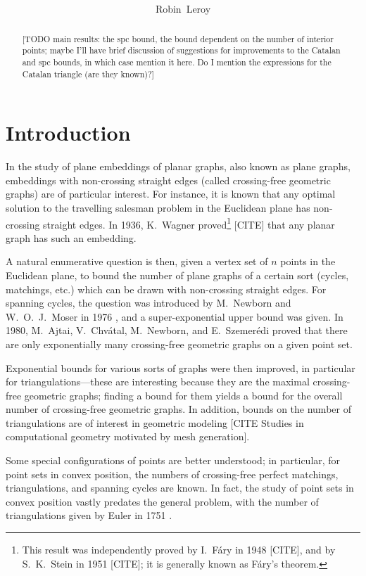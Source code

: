 \documentclass[10pt, a4paper, twoside]{basestyle}
\title{%
\textdisplay{%
Crossing-Free Perfect Matchings%
}%
}
\author{Robin~Leroy}
\begin{document}
\maketitle
\begin{abstract}
[TODO main results: the spc bound, the bound dependent on the number of interior points;
maybe I'll have brief discussion of suggestions for improvements to the Catalan and spc
bounds, in which case mention it here.
Do I mention the expressions for the Catalan triangle (are they known)?]
\end{abstract}

\section*{Introduction}
In the study of plane embeddings of planar graphs, also known as plane graphs,
embeddings with non-crossing straight edges (called crossing-free geometric graphs) are of particular
interest.
For instance, it is known \cite{LeeuwenSchoone1981} that any optimal solution to the travelling salesman problem in the
Euclidean plane has non-crossing straight edges.
In 1936, K.~Wagner proved\footnote{This result was independently proved by I.~Fáry in 1948 [CITE], and by
S.~K.~Stein in 1951 [CITE]; it is generally known as Fáry's theorem.} [CITE] that any planar graph has such an
embedding.

A natural enumerative question is then, given a vertex set of $n$ points in the Euclidean plane,
to bound the number of plane graphs of a certain sort (cycles, matchings, etc.) which can be
drawn with non-crossing straight edges.
For spanning cycles, the question was introduced by M.~Newborn and W.~O.~J.~Moser in 1976 \cite{NewbornMoser1980},
and a super-exponential upper bound was given.
In 1980, M.~Ajtai, V.~Chvátal, M.~Newborn, and E.~Szemerédi \cite{AjtaiChvatalNewbornSzemeredi1982}
proved that there are only exponentially many crossing-free geometric graphs on a given point set.

Exponential bounds for various sorts of graphs were then improved, in particular for triangulations---these are
interesting because they are the maximal crossing-free geometric graphs; finding a bound for them yields a bound
for the overall number of crossing-free geometric graphs. In addition, bounds on the number of triangulations
are of interest in geometric modeling [CITE Studies in computational geometry motivated by mesh generation].

Some special configurations of points are better understood; in particular, for point sets in convex position,
the numbers of crossing-free perfect matchings, triangulations, and spanning cycles are known. In fact, the study
of point sets in convex position vastly predates the general problem, with the number of triangulations given by
Euler in 1751 \cite{Euler1751}.
\end{document}
